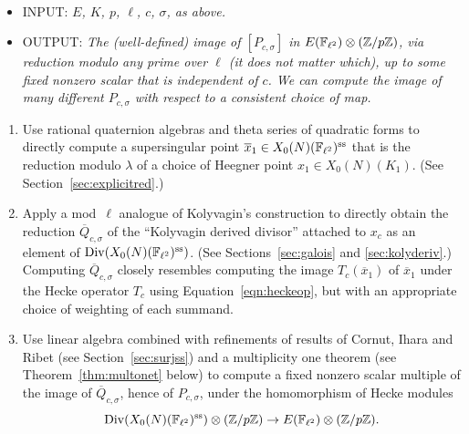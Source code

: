 \documentclass{article} \usepackage[active]{srcltx}
\DeclareMathOperator{\supersingular}{ss}
\renewcommand{\ss}{\supersingular}
\begin{document}
\begin{algorithm}\label{alg:main}\mbox{}\\\vspace{-2ex}
\begin{itemize}
\item INPUT: {\em $E$, $K$, $p$, $\ell$, $c$, $\sigma$, as above.}

\item OUTPUT: {\em The (well-defined) image of $[P_{c,\sigma}]$ in
    $E(\mathbb{F}_{\ell^2})\otimes (\mathbb{Z}/p\mathbb{Z})$, via reduction modulo any prime
    over $\ell$ (it does not matter which), up to some fixed
    nonzero scalar that is independent of $c$.  We can compute the
    image of many different $P_{c,\sigma}$ with respect to a consistent choice
    of map.}
\end{itemize}

\begin{enumerate}
\item Use rational quaternion algebras and theta series of quadratic
  forms to directly compute a supersingular point $\overline{x}_1 \in
  X_0(N)(\F_{\ell^2})^{\ss}$ that is the reduction modulo $\lambda$ of
  a choice of Heegner point $x_1 \in X_0(N)(K_1)$.  (See
  Section~\ref{sec:explicitred}.)

\item Apply a mod~$\ell$ analogue of Kolyvagin's construction to
  directly obtain the reduction $\overline{Q}_{c,\sigma}$ of the
  ``Kolyvagin derived divisor'' attached to $x_c$ as an element of
  $\Div(X_0(N)(\F_{\ell^2})^{\ss})$.  (See Sections~\ref{sec:galois}
  and \ref{sec:kolyderiv}.)  Computing $\overline{Q}_{c,\sigma}$
  closely resembles computing the image $T_c(\overline{x}_1)$ of
  $\overline{x}_1$ under the Hecke operator $T_c$ using
  Equation~\eqref{eqn:heckeop}, but with an appropriate choice of
  weighting of each summand.
  
\item\label{step:outline_linalg} Use linear algebra combined with
  refinements of results of Cornut, Ihara and Ribet (see
  Section~\ref{sec:surjss}) and a multiplicity one theorem (see
  Theorem~\ref{thm:multonet} below) to compute a fixed nonzero scalar
  multiple of the image of $\overline{Q}_{c,\sigma}$, hence of
  $P_{c,\sigma}$, under the homomorphism of Hecke modules
\begin{equation}\label{eqn:modtoE}
\Div(X_0(N)(\F_{\ell^2})^{\ss})\tensor(\Z/p\Z) 
      \to E(\F_{\ell^2})\tensor (\Z/p\Z).
\end{equation}

\end{enumerate} 
\end{algorithm}
\end{document}
